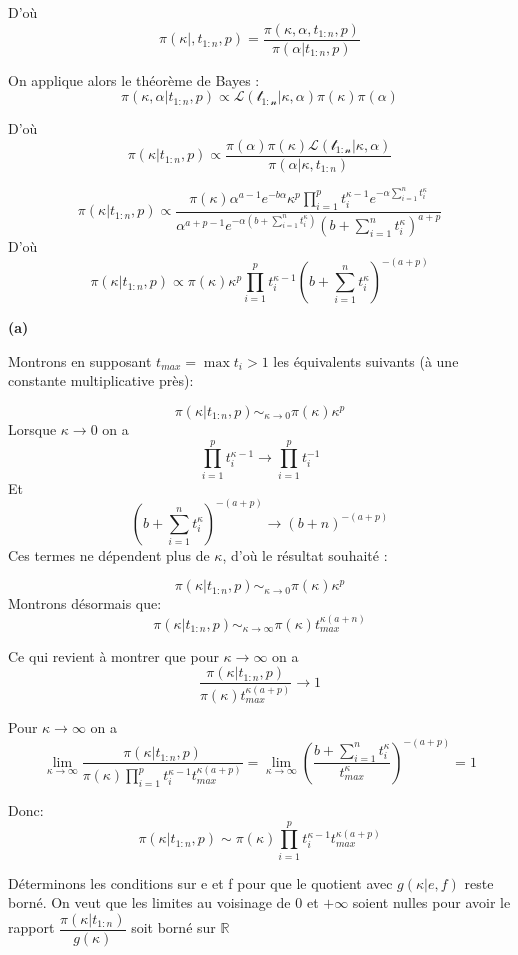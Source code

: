 \documentclass[
]{article}
\begin{document}
D'où
\[\pi(\kappa|,t_{1:n},p)  = \dfrac{\pi(\kappa,\alpha ,t_{1:n},p)}{\pi(\alpha | t_{1:n},p)}\]

On applique alors le théorème de Bayes :
\[\pi(\kappa,\alpha | t_{1:n},p) \propto \mathcal{L(t_{1:n}|\kappa,\alpha)}\pi(\kappa)\pi(\alpha)\]

D'où
\[\pi(\kappa | t_{1:n},p) \propto \dfrac{\pi(\alpha)\pi(\kappa) \mathcal{L(t_{1:n}|\kappa,\alpha)}}{\pi(\alpha|\kappa,t_{1:n})}\]

\[\pi(\kappa | t_{1:n},p) \propto \dfrac{\pi(\kappa)\alpha^{a-1}e^{-b\alpha}\kappa^{p}\prod_{i=1}^{p} t_{i}^{\kappa-1}e^{-\alpha\sum_{i=1}^{n}t_{i}^{\kappa}}}{\alpha^{a+p-1}e^{-\alpha(b+\sum_{i = 1}^{n} t_{i}^{\kappa})}(b+\sum_{i = 1}^{n} t_{i}^{\kappa})^{a+p}}\]
D'où
\[\pi(\kappa | t_{1:n},p) \propto \pi(\kappa) \kappa^{p} \prod_{i=1}^{p} t_{i}^{\kappa-1}(b+\sum_{i = 1}^{n} t_{i}^{\kappa})^{-(a+p)}\]

\textbf{(a)}

Montrons en supposant \(t_{max} = \max t_{i} > 1\) les équivalents
suivants (à une constante multiplicative près):

\[\pi(\kappa|t_{1:n},p) \sim_{\kappa\to0 } \pi(\kappa)\kappa^{p}\]
Lorsque \(\kappa \to 0\) on a
\[\prod_{i=1}^{p} t_{i}^{\kappa-1} \to \prod_{i=1}^{p} t_{i}^{-1} \] Et
\[(b+\sum_{i = 1}^{n} t_{i}^{\kappa})^{-(a+p)} \to (b+n)^{-(a+p)}\] Ces
termes ne dépendent plus de \(\kappa\), d'où le résultat souhaité :

\[\pi(\kappa|t_{1:n},p) \sim_{\kappa\to0 } \pi(\kappa)\kappa^{p} \]
Montrons désormais que:
\[\pi(\kappa|t_{1:n},p) \sim_{\kappa\to \infty } \pi(\kappa)t_{max}^{\kappa(a+n)}\]

Ce qui revient à montrer que pour \(\kappa\to \infty\) on a
\[\dfrac{\pi(\kappa|t_{1:n},p)}{\pi(\kappa)t_{max}^{\kappa(a+p)}} \to 1 \]

Pour \(\kappa\to \infty\) on a
\[\lim_{\kappa\to \infty} \dfrac{\pi(\kappa|t_{1:n},p)}{\pi(\kappa)\prod_{i=1}^{p}t_{i}^{\kappa-1}t_{max}^{\kappa(a+p)}} = \lim_{\kappa\to \infty} (\dfrac{b+\sum_{i = 1}^{n} t_{i}^{\kappa}}{t_{max}^{\kappa}})^{-(a+p)} = 1\]

Donc:
\[\pi(\kappa|t_{1:n},p) \sim  \pi(\kappa)\prod_{i=1}^{p}t_{i}^{\kappa-1}t_{max}^{\kappa(a+p)}\]

Déterminons les conditions sur e et f pour que le quotient avec
\(g(\kappa | e,f)\) reste borné. On veut que les limites au voisinage de
0 et \(+ \infty\) soient nulles pour avoir le rapport
\(\dfrac{\pi(\kappa| t_{1:n})}{g(\kappa)}\) soit borné sur
\(\mathbb{R}\)
\end{document}
